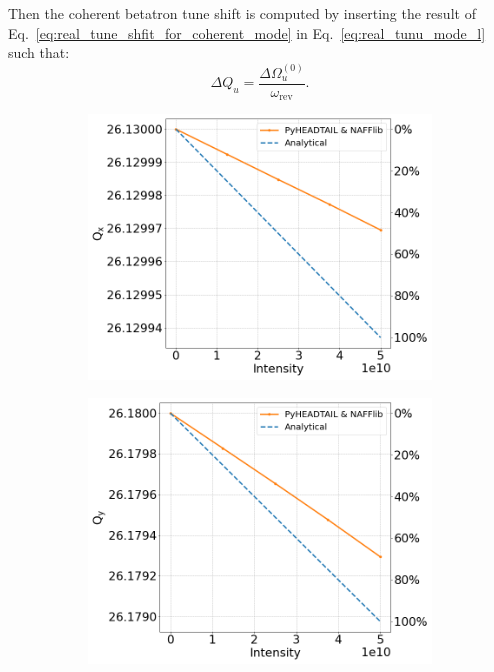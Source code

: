 Then the coherent betatron tune shift is computed by inserting the result of Eq.~\eqref{eq:real_tune_shfit_for_coherent_mode} in Eq.~\eqref{eq:real_tunu_mode_l} such that: 
\begin{equation}
    \Delta Q_u = \frac{\Delta \Omega_u^{(0)}}{\omega_\mathrm{rev}}.
\end{equation}


\begin{figure}[!ht]
    \centering
    \begin{subfigure}[t]{0.45\textwidth}
        \centering
        \includegraphics[width=1\textwidth]{images/Ch7/Qx_vs_intensity_complete_impedance_sps_q26model_MD2018_parameters.png}
    \end{subfigure}
    \hfill
    \begin{subfigure}[t]{0.45\textwidth}
        \centering
        \includegraphics[width=1\textwidth]{images/Ch7/Qy_vs_intensity_complete_impedance_sps_q26model_MD2018_parameters.png}

\end{subfigure}
\end{figure}
